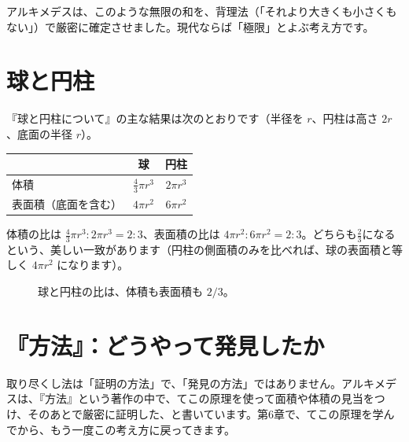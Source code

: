 \documentclass[a4paper,11pt,openany]{ltjsbook}
\begin{document}
アルキメデスは、このような無限の和を、背理法（「それより大きくも小さくもない」）で厳密に確定させました。現代ならば「極限」とよぶ考え方です。

\section{球と円柱}

『球と円柱について』の主な結果は次のとおりです（半径を $r$、円柱は高さ $2r$、底面の半径 $r$）。

\begin{center}
\begin{tabular}{lcc}
\toprule
 & 球 & 円柱 \\
\midrule
体積 & $\frac43\pi r^3$ & $2\pi r^3$ \\
表面積（底面を含む） & $4\pi r^2$ & $6\pi r^2$ \\
\bottomrule
\end{tabular}
\end{center}

体積の比は $\frac43\pi r^3 : 2\pi r^3 = 2:3$、表面積の比は $4\pi r^2:6\pi r^2=2:3$。どちらも$\frac23$になるという、美しい一致があります（円柱の側面積のみを比べれば、球の表面積と等しく $4\pi r^2$ になります）。

\begin{figure}[htbp]
\centering
{}
\caption{球と円柱の比は、体積も表面積も $2/3$。}
\end{figure}

\section{『方法』：どうやって発見したか}

取り尽くし法は「証明の方法」で、「発見の方法」ではありません。アルキメデスは、『方法』という著作の中で、てこの原理を使って面積や体積の見当をつけ、そのあとで厳密に証明した、と書いています。第6章で、てこの原理を学んでから、もう一度この考え方に戻ってきます。
\end{document}
